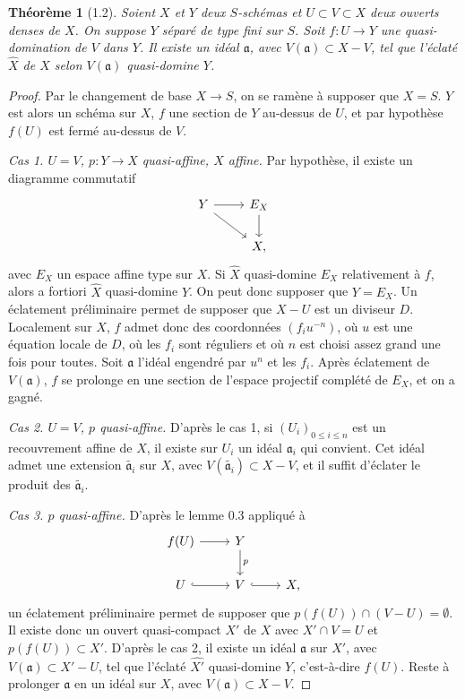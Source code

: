 \documentclass[11pt]{article}
\newtheorem*{theorem}{Théorème}
\newcommand{\tw}[1]{\widetilde{#1}}
\newcommand{\wh}[1]{\widehat{#1}}
\begin{document}
\begin{theorem}[1.2]
Soient \(X\) et \(Y\) deux \(S\)-schémas et \(U\subset V\subset X\) deux ouverts denses de \(X\). On suppose \(Y\) séparé de type fini sur \(S\). Soit \(f:U\to Y\) une quasi-domination de \(V\) dans \(Y\). Il existe un idéal \(\mathfrak a\), avec \(V(\mathfrak a)\subset X-V\), tel que l'éclaté \(\wh X\) de \(X\) selon \(V(\mathfrak a)\) quasi-domine \(Y\).
\end{theorem}

\begin{proof}
Par le changement de base \(X\to S\), on se ramène à supposer que \(X=S\). \(Y\) est alors un schéma sur \(X\), \(f\) une section de \(Y\) au-dessus de \(U\), et par hypothèse \(f(U)\) est fermé au-dessus de \(V\).

\emph{Cas 1. \(U=V\), \(p:Y\to X\) quasi-affine, \(X\) affine.} Par hypothèse, il existe un diagramme commutatif
\[
\begin{tikzcd}
Y \ar[r] \ar[dr] & E_X \ar[d] \\
& X,
\end{tikzcd}
\]
avec \(E_X\) un espace affine type sur \(X\). Si \(\wh X\) quasi-domine \(E_X\) relativement à \(f\), alors a fortiori \(\wh X\) quasi-domine \(Y\). On peut donc supposer que \(Y=E_X\). Un éclatement préliminaire permet de supposer que \(X-U\) est un diviseur \(D\). Localement sur \(X\), \(f\) admet donc des coordonnées \((f_i u^{-n})\), où \(u\) est une équation locale de \(D\), où les \(f_i\) sont réguliers et où \(n\) est choisi assez grand une fois pour toutes. Soit \(\mathfrak a\) l'idéal engendré par \(u^n\) et les \(f_i\). Après éclatement de \(V(\mathfrak a)\), \(f\) se prolonge en une section de l'espace projectif complété de \(E_X\), et on a gagné.

\emph{Cas 2. \(U=V\), \(p\) quasi-affine.} D'après le cas 1, si \((U_i)_{0\le i\le n}\) est un recouvrement affine de \(X\), il existe sur \(U_i\) un idéal \(\mathfrak a_i\) qui convient. Cet idéal admet une extension \(\tw{\mathfrak a_i}\) sur \(X\), avec \(V(\tw{\mathfrak a_i})\subset X-V\), et il suffit d'éclater le produit des \(\tw{\mathfrak a_i}\).

\emph{Cas 3. \(p\) quasi-affine.} D'après le lemme 0.3 appliqué à
\[
\begin{tikzcd}
f(U) \ar[r] & Y \ar[d,"p"] \\
U \ar[r,hook] & V \ar[r,hook] & X,
\end{tikzcd}
\]
un éclatement préliminaire permet de supposer que \(p(f(U))\cap(V-U)=\emptyset\). Il existe donc un ouvert quasi-compact \(X'\) de \(X\) avec \(X'\cap V=U\) et \(p(f(U))\subset X'\). D'après le cas 2, il existe un idéal \(\mathfrak a\) sur \(X'\), avec \(V(\mathfrak a)\subset X'-U\), tel que l'éclaté \(\wh{X'}\) quasi-domine \(Y\), c'est-à-dire \(f(U)\). Reste à prolonger \(\mathfrak a\) en un idéal sur \(X\), avec \(V(\mathfrak a)\subset X-V\).


\end{proof}
\end{document}
